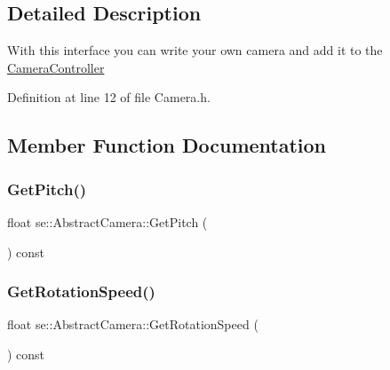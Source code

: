 \subsection{Detailed Description}
With this interface you can write your own camera and add it to the \mbox{\hyperlink{classse_1_1_camera_controller}{Camera\+Controller}} 

Definition at line 12 of file Camera.\+h.



\subsection{Member Function Documentation}
\mbox{\label{classse_1_1_abstract_camera_afe009ee2de0fa0c4d37d446bb7d91ccf}} 
\subsubsection{\texorpdfstring{Get\+Pitch()}{GetPitch()}}
{\footnotesize\ttfamily float se\+::\+Abstract\+Camera\+::\+Get\+Pitch (\begin{DoxyParamCaption}{ }\end{DoxyParamCaption}) const}

\mbox{\label{classse_1_1_abstract_camera_a5762156f8dd3d3d79666cb2f23e45fa2}} 
\subsubsection{\texorpdfstring{Get\+Rotation\+Speed()}{GetRotationSpeed()}}
{\footnotesize\ttfamily float se\+::\+Abstract\+Camera\+::\+Get\+Rotation\+Speed (\begin{DoxyParamCaption}{ }\end{DoxyParamCaption}) const}

\mbox{\label{classse_1_1_abstract_camera_a6720fc7f0712a59b8dc3d3b5f3c20dc4}} 
